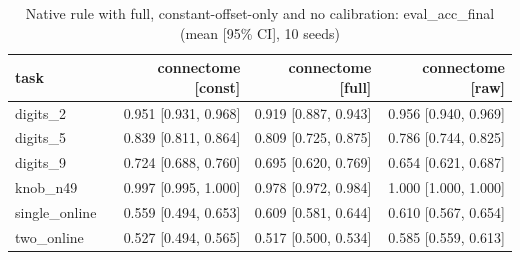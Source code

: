 \begin{table}[t]
\centering
\small
\begin{tabular}{lrrr}
\toprule
task & connectome [const] & connectome [full] & connectome [raw] \\
\midrule
digits\_2 & 0.951 [0.931, 0.968] & 0.919 [0.887, 0.943] & 0.956 [0.940, 0.969] \\
digits\_5 & 0.839 [0.811, 0.864] & 0.809 [0.725, 0.875] & 0.786 [0.744, 0.825] \\
digits\_9 & 0.724 [0.688, 0.760] & 0.695 [0.620, 0.769] & 0.654 [0.621, 0.687] \\
knob\_n49 & 0.997 [0.995, 1.000] & 0.978 [0.972, 0.984] & 1.000 [1.000, 1.000] \\
single\_online & 0.559 [0.494, 0.653] & 0.609 [0.581, 0.644] & 0.610 [0.567, 0.654] \\
two\_online & 0.527 [0.494, 0.565] & 0.517 [0.500, 0.534] & 0.585 [0.559, 0.613] \\
\bottomrule
\end{tabular}
\caption{Native rule with full, constant-offset-only and no calibration: eval\_acc\_final (mean [95\% CI], 10 seeds)}
\label{tab:nocalib_eval_acc_final}
\end{table}